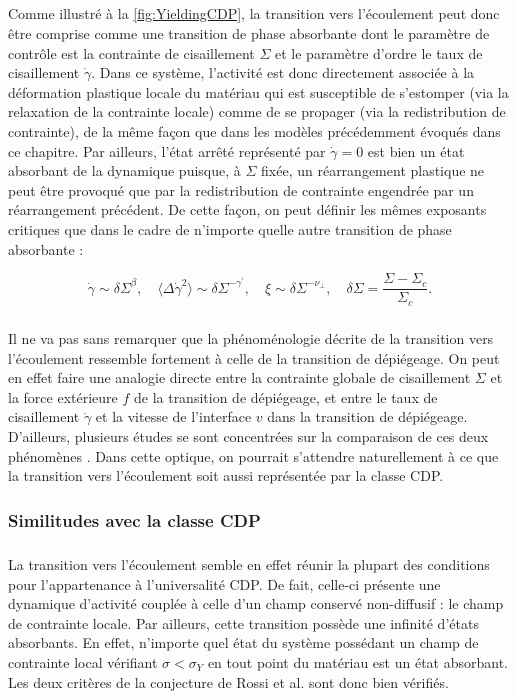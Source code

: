 \subparagraph{}Comme illustré à la \autoref{fig:YieldingCDP}, la transition vers l'écoulement peut donc être comprise comme une transition de phase absorbante dont le paramètre de contrôle est la contrainte de cisaillement $\Sigma$ et le paramètre d'ordre le taux de cisaillement $\dot{\gamma}$. Dans ce système, l'activité est donc directement associée à la déformation plastique locale du matériau qui est susceptible de s'estomper (via la relaxation de la contrainte locale) comme de se propager (via la redistribution de contrainte), de la même façon que dans les modèles précédemment évoqués dans ce chapitre. Par ailleurs, l'état arrêté représenté par $\dot{\gamma} = 0$ est bien un état absorbant de la dynamique puisque, à $\Sigma$ fixée, un réarrangement plastique ne peut être provoqué que par la redistribution de contrainte engendrée par un réarrangement précédent. De cette façon, on peut définir les mêmes exposants critiques que dans le cadre de n'importe quelle autre transition de phase absorbante :

\begin{equation}
	\dot{\gamma} \sim \delta\Sigma^\beta,\quad \langle\Delta\dot{\gamma}^2\rangle \sim \delta\Sigma^{-\gamma^\prime}, \quad \xi \sim \delta\Sigma^{-\nu_\perp}, \quad \delta\Sigma = \frac{\Sigma-\Sigma_c}{\Sigma_c}.
\end{equation}

\subparagraph{}Il ne va pas sans remarquer que la phénoménologie décrite de la transition vers l'écoulement ressemble fortement à celle de la transition de dépiégeage. On peut en effet faire une analogie directe entre la contrainte globale de cisaillement $\Sigma$ et la force extérieure $f$ de la transition de dépiégeage, et entre le taux de cisaillement $\dot{\gamma}$ et la vitesse de l'interface $v$ dans la transition de dépiégeage. D'ailleurs, plusieurs études se sont concentrées sur la comparaison de ces deux phénomènes \cite{lin_scaling_2014, ferrero_elastic_2019, tyukodi_depinning_2016}. Dans cette optique, on pourrait s'attendre naturellement à ce que la transition vers l'écoulement soit aussi représentée par la classe CDP.

\subsubsection{Similitudes avec la classe CDP}

\subparagraph{}La transition vers l'écoulement semble en effet réunir la plupart des conditions pour l'appartenance à l'universalité CDP. De fait, celle-ci présente une dynamique d'activité couplée à celle d'un champ conservé non-diffusif : le champ de contrainte locale. Par ailleurs, cette transition possède une infinité d'états absorbants. En effet, n'importe quel état du système possédant un champ de contrainte local vérifiant $\sigma < \sigma_Y$ en tout point du matériau est un état absorbant. Les deux critères de la conjecture de Rossi et al. \cite{rossi_universality_2000} sont donc bien vérifiés.

